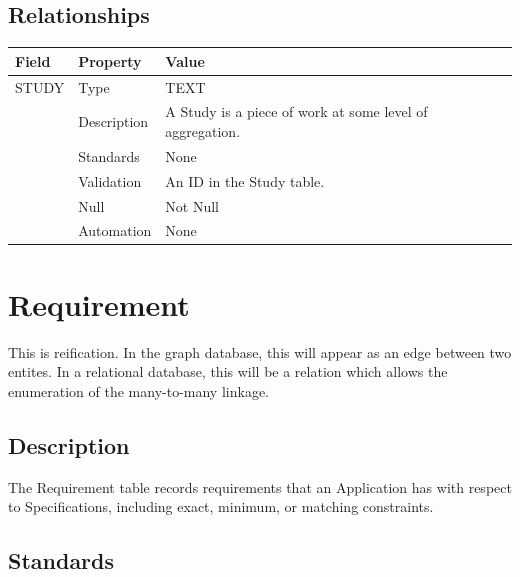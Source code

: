 \subsection{Relationships}\label{relationships-22}

\begin{longtable}[]{@{}
  >{\raggedright\arraybackslash}p{}
  >{\raggedright\arraybackslash}p{}
  >{\raggedright\arraybackslash}p{}@{}}
\toprule\noalign{}
\begin{minipage}[b]{\linewidth}\raggedright
Field
\end{minipage} & \begin{minipage}[b]{\linewidth}\raggedright
Property
\end{minipage} & \begin{minipage}[b]{\linewidth}\raggedright
Value
\end{minipage} \\
\midrule\noalign{}
\endhead
\bottomrule\noalign{}
\endlastfoot
STUDY & Type & TEXT \\
& Description & A Study is a piece of work at some level of
aggregation. \\
& Standards & None \\
& Validation & An ID in the Study table. \\
& Null & Not Null \\
& Automation & None \\
\end{longtable}

\section{Requirement}\label{requirement}

This is reification. In the graph database, this will appear as an edge
between two entites. In a relational database, this will be a relation
which allows the enumeration of the many-to-many linkage.

\subsection{Description}\label{description-26}

The Requirement table records requirements that an Application has with
respect to Specifications, including exact, minimum, or matching
constraints.

\subsection{Standards}\label{standards-28}

